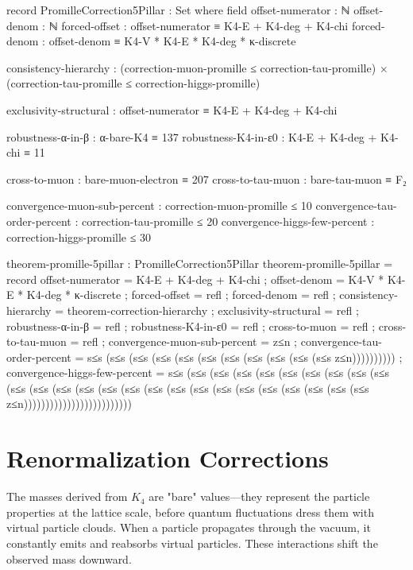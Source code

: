\documentclass[11pt,a4paper]{book}
\begin{document}
\begin{code}
record PromilleCorrection5Pillar : Set where
  field
    offset-numerator : ℕ
    offset-denom : ℕ
    forced-offset : offset-numerator ≡ K4-E + K4-deg + K4-chi
    forced-denom : offset-denom ≡ K4-V * K4-E * K4-deg * κ-discrete
    
    consistency-hierarchy : (correction-muon-promille ≤ correction-tau-promille) × 
                            (correction-tau-promille ≤ correction-higgs-promille)
    
    exclusivity-structural : offset-numerator ≡ K4-E + K4-deg + K4-chi
    
    robustness-α-in-β : α-bare-K4 ≡ 137
    robustness-K4-in-ε0 : K4-E + K4-deg + K4-chi ≡ 11
    
    cross-to-muon : bare-muon-electron ≡ 207
    cross-to-tau-muon : bare-tau-muon ≡ F₂
    
    convergence-muon-sub-percent : correction-muon-promille ≤ 10
    convergence-tau-order-percent : correction-tau-promille ≤ 20
    convergence-higgs-few-percent : correction-higgs-promille ≤ 30

theorem-promille-5pillar : PromilleCorrection5Pillar
theorem-promille-5pillar = record
  { offset-numerator = K4-E + K4-deg + K4-chi
  ; offset-denom = K4-V * K4-E * K4-deg * κ-discrete
  ; forced-offset = refl
  ; forced-denom = refl
  ; consistency-hierarchy = theorem-correction-hierarchy
  ; exclusivity-structural = refl
  ; robustness-α-in-β = refl
  ; robustness-K4-in-ε0 = refl
  ; cross-to-muon = refl
  ; cross-to-tau-muon = refl
  ; convergence-muon-sub-percent = z≤n
  ; convergence-tau-order-percent = s≤s (s≤s (s≤s (s≤s (s≤s (s≤s (s≤s (s≤s (s≤s (s≤s (s≤s z≤n))))))))))
  ; convergence-higgs-few-percent = s≤s (s≤s (s≤s (s≤s (s≤s (s≤s (s≤s (s≤s (s≤s (s≤s (s≤s (s≤s (s≤s (s≤s (s≤s (s≤s (s≤s (s≤s (s≤s (s≤s (s≤s (s≤s (s≤s (s≤s (s≤s (s≤s z≤n)))))))))))))))))))))))))
  }

\end{code}

\section{Renormalization Corrections}

The masses derived from $K_4$ are "bare" values---they represent the particle properties at the lattice scale, before quantum fluctuations dress them with virtual particle clouds.
When a particle propagates through the vacuum, it constantly emits and reabsorbs virtual particles. These interactions shift the observed mass downward.
\end{document}
